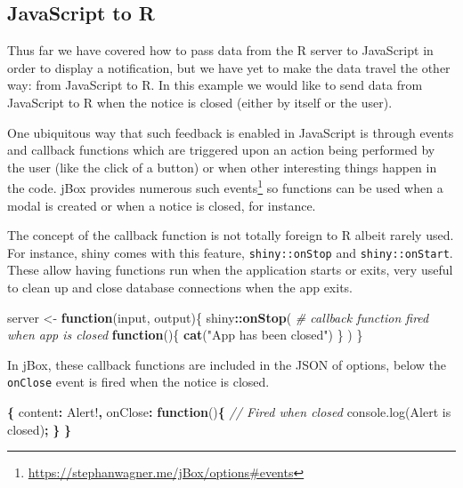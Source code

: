 \documentclass[
  10pt,
]{krantz}
\makeatletter
\newenvironment{Shaded}{\begin{snugshade}}{\end{snugshade}}
\newcommand{\AttributeTok}[1]{\textcolor[rgb]{0.61,0.61,0.61}{#1}}
\newcommand{\CommentTok}[1]{\textcolor[rgb]{0.37,0.37,0.37}{\textit{#1}}}
\newcommand{\ControlFlowTok}[1]{\textcolor[rgb]{0.27,0.27,0.27}{\textbf{#1}}}
\newcommand{\DataTypeTok}[1]{\textcolor[rgb]{0.27,0.27,0.27}{#1}}
\newcommand{\KeywordTok}[1]{\textcolor[rgb]{0.27,0.27,0.27}{\textbf{#1}}}
\newcommand{\NormalTok}[1]{#1}
\newcommand{\OperatorTok}[1]{\textcolor[rgb]{0.43,0.43,0.43}{\textbf{#1}}}
\newcommand{\StringTok}[1]{\textcolor[rgb]{0.5,0.5,0.5}{#1}}
\newcommand{\VariableTok}[1]{\textcolor[rgb]{0,0,0}{#1}}
\renewcommand{\href}[2]{#2\footnote{\url{#1}}}
\newenvironment{kframe}{%
\medskip{}
\setlength{\fboxsep}{.8em}
 \def\at@end@of@kframe{}%
 \ifinner\ifhmode%
  \def\at@end@of@kframe{\end{minipage}}%
  \begin{minipage}{\columnwidth}%
 \fi\fi%
 \def\FrameCommand##1{\hskip\@totalleftmargin \hskip-\fboxsep
 \colorbox{shadecolor}{##1}\hskip-\fboxsep
     \hskip-\linewidth \hskip-\@totalleftmargin \hskip\columnwidth}%
 \MakeFramed {\advance\hsize-\width
   \@totalleftmargin\z@ \linewidth\hsize
   \@setminipage}}%
 {\par\unskip\endMakeFramed%
 \at@end@of@kframe}
\renewenvironment{Shaded}{\begin{kframe}}{\end{kframe}}
\makeatother
\begin{document}
\hypertarget{shiny-intro-js2r}{%
\subsection{JavaScript to R}\label{shiny-intro-js2r}}

Thus far we have covered how to pass data from the R server to JavaScript in order to display a notification, but we have yet to make the data travel the other way: from JavaScript to R. In this example we would like to send data from JavaScript to R when the notice is closed (either by itself or the user).

One ubiquitous way that such feedback is enabled in JavaScript is through events and callback functions which are triggered upon an action being performed by the user (like the click of a button) or when other interesting things happen in the code. jBox provides numerous such \href{https://stephanwagner.me/jBox/options\#events}{events} so functions can be used when a modal is created or when a notice is closed, for instance.

The concept of the callback function is not totally foreign to R albeit rarely used. For instance, shiny comes with this feature, \texttt{shiny::onStop} and \texttt{shiny::onStart}. These allow having functions run when the application starts or exits, very useful to clean up and close database connections when the app exits.

\begin{Shaded}
\begin{Highlighting}[]
\NormalTok{server <{-}}\StringTok{ }\ControlFlowTok{function}\NormalTok{(input, output)\{}
\NormalTok{  shiny}\OperatorTok{::}\KeywordTok{onStop}\NormalTok{(}
    \CommentTok{\# callback function fired when app is closed}
    \ControlFlowTok{function}\NormalTok{()\{}
      \KeywordTok{cat}\NormalTok{(}\StringTok{"App has been closed"}\NormalTok{)}
\NormalTok{    \}}
\NormalTok{  )}
\NormalTok{\}}
\end{Highlighting}
\end{Shaded}

In jBox, these callback functions are included in the JSON of options, below the \texttt{onClose} event is fired when the notice is closed.

\begin{Shaded}
\begin{Highlighting}[]
\OperatorTok{\{}
  \DataTypeTok{content}\OperatorTok{:} \StringTok{\textquotesingle{}Alert!\textquotesingle{}}\OperatorTok{,}
  \DataTypeTok{onClose}\OperatorTok{:} \KeywordTok{function}\NormalTok{()}\OperatorTok{\{}
    \CommentTok{// Fired when closed }
    \VariableTok{console}\NormalTok{.}\AttributeTok{log}\NormalTok{(}\StringTok{\textquotesingle{}Alert is closed\textquotesingle{}}\NormalTok{)}\OperatorTok{;}
  \OperatorTok{\}}
\OperatorTok{\}}
\end{Highlighting}
\end{Shaded}
\end{document}
